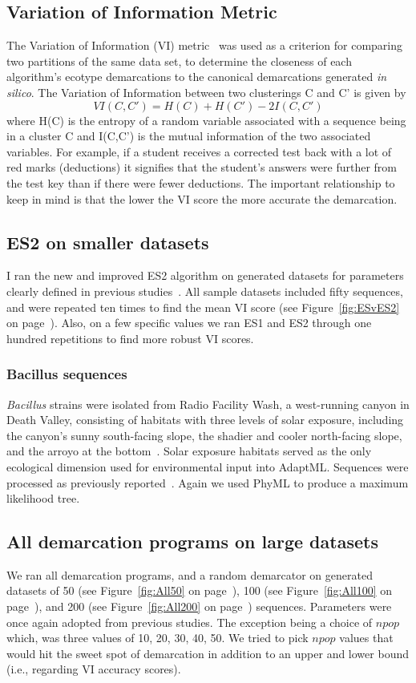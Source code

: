 \subsection*{Variation of Information Metric}
The Variation of Information (VI) metric~\cite{meilua2003comparing} was used as a criterion for comparing two partitions of the same data set, to determine the closeness of each algorithm's ecotype demarcations to the canonical demarcations generated \emph{in silico}.
The Variation of Information between two clusterings C and C' is given by$$VI(C, C') = H(C) + H(C') - 2I(C, C')$$where H(C) is the entropy of a random variable associated with a sequence being in a cluster C and I(C,C') is the mutual information of the two associated variables.
For example, if a student receives a corrected test back with a lot of red marks (deductions) it signifies that the student's answers were further from the test key than if there were fewer deductions.
The important relationship to keep in mind is that the lower the VI score the more accurate the demarcation.

\subsection*{ES2 on smaller datasets}
I ran the new and improved ES2 algorithm on generated datasets for parameters clearly defined in previous studies~\cite{carlo}.
All sample datasets included fifty sequences, and were repeated ten times to find the mean VI score (see Figure~\ref{fig:ESvES2} on page~\pageref{fig:ESvES2}). Also, on a few specific values we ran ES1 and ES2 through one hundred repetitions to find more robust VI scores.

\subsubsection*{Bacillus sequences}
\emph{Bacillus} strains were isolated from Radio Facility Wash, a west-running canyon in Death Valley, consisting of habitats with three levels of solar exposure, including the canyon's sunny south-facing slope, the shadier and cooler north-facing slope, and the arroyo at the bottom~\cite{connor2010ecology}.
Solar exposure habitats served as the only ecological dimension used for environmental input into AdaptML.
Sequences were processed as previously reported~\cite{carlo}.
Again we used PhyML to produce a maximum likelihood tree.

\subsection*{All demarcation programs on large datasets}
We ran all demarcation programs, and a random demarcator on generated datasets of 50 (see Figure~\ref{fig:All50} on page~\pageref{fig:All50}), 100 (see Figure~\ref{fig:All100} on page~\pageref{fig:All100}), and 200 (see Figure~\ref{fig:All200} on page~\pageref{fig:All200}) sequences.
Parameters were once again adopted from previous studies.
The exception being a choice of $npop$ which, was three values of 10, 20, 30, 40, 50.
We tried to pick $npop$ values that would hit the sweet spot of demarcation in addition to an upper and lower bound (i.e., regarding VI accuracy scores).

